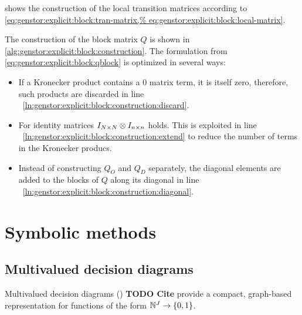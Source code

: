  shows the construction of
the local transition matrices according to
\cref{eq:genstor:explicit:block:tran-matrix,%
eq:genstor:explicit:block:local-matrix}.

The construction of the block matrix $Q$ is shown in
\vref{alg:genstor:explicit:block:construction}. The formulation from
\cref{eq:genstor:explicit:block:qblock} is optimized in several ways:
\begin{itemize}
\item If a Kronecker product contains a $0$ matrix term, it is itself
  zero, therefore, such products are discarded in line%
  ~\ref{ln:genstor:explicit:block:construction:discard}.
\item For identity matrices $I_{N \times N} \otimes I_{n \times n}$
  holds. This is exploited in line%
  ~\ref{ln:genstor:explicit:block:construction:extend} to reduce the
  number of terms in the Kronecker producs.
\item Instead of constructing $Q_O$ and $Q_D$ separately, the diagonal
  elements are added to the blocks of $Q$ along its diagonal in line%
  ~\ref{ln:genstor:explicit:block:construction:diagonal}.
\end{itemize}

\section{Symbolic methods}

\subsection{Multivalued decision diagrams}

Multivalued decision diagrams () \textbf{TODO Cite}
provide a compact, graph-based representation for functions of the
form $\mathbb{N}^J \to \{0, 1\}$.

